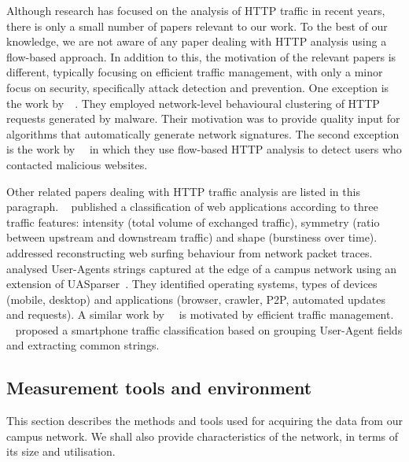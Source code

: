 Although research has focused on the analysis of HTTP traffic in recent years, there is only a small number of papers relevant to our work. To the best of our knowledge, we are not aware of any paper dealing with HTTP analysis using a flow-based approach. In addition to this, the motivation of the relevant papers is different, typically focusing on efficient traffic management, with only a minor focus on security, specifically attack detection and prevention. One exception is the work by~\citeauthor{Perdisci-2010-Behavioral}~\cite{Perdisci-2010-Behavioral}. They employed network-level behavioural clustering of HTTP requests generated by malware. Their motivation was to provide quality input for algorithms that automatically generate network signatures. The second exception is the work by~\citeauthor{Husak-2014-PhiGARo}~\cite{Husak-2014-PhiGARo} in which they use flow-based HTTP analysis to detect users who contacted malicious websites.

Other related papers dealing with HTTP traffic analysis are listed in this paragraph. \citeauthor{Augustin-2011-Traffic}~\cite{Augustin-2011-Traffic} published a classification of web applications according to three traffic features: intensity (total volume of exchanged traffic), symmetry (ratio between upstream and downstream traffic) and shape (burstiness over time). \citeauthor{Xie-2013-ReSurf}~\cite{Xie-2013-ReSurf} addressed reconstructing web surfing behaviour from network packet traces. \citeauthor{Xu-2014-Toward}~\cite{Xu-2014-Toward} analysed User-Agents strings captured at the edge of a campus network using an extension of UASparser~\cite{Mallat-2017-UASparser}. They identified operating systems, types of devices (mobile, desktop) and applications (browser, crawler, P2P, automated updates and requests). A similar work by~\citeauthor{Jin-2012-Integrated}~\cite{Jin-2012-Integrated} is motivated by efficient traffic management. \citeauthor{Hur-2012-Towards}~\cite{Hur-2012-Towards} proposed a smartphone traffic classification based on grouping User-Agent fields and extracting common strings.

\subsection{Measurement tools and environment}\label{subsec:httpsecurity-measurement}

This section describes the methods and tools used for acquiring the data from our campus network. We shall also provide characteristics of the network, in terms of its size and utilisation.

